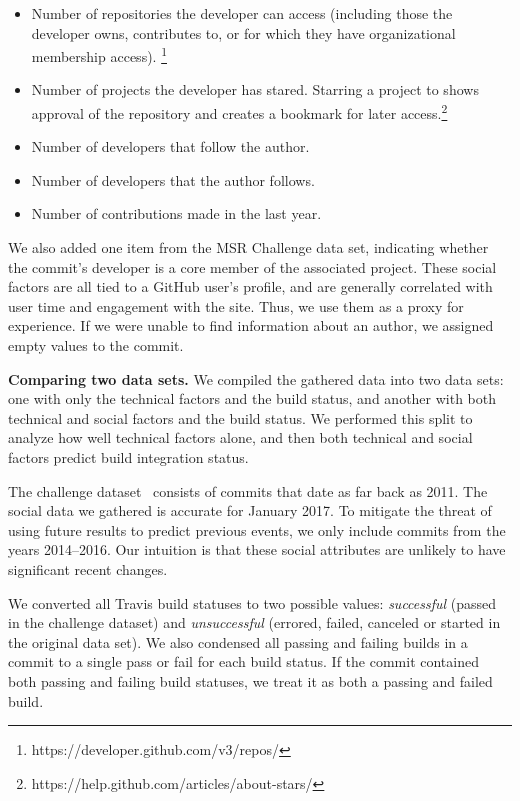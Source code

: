 \documentclass[10pt, conference]{IEEEtran}
\begin{document}
\begin{itemize}
	\item Number of repositories the developer can access (including those
the developer owns, contributes to, or for which they have
organizational membership access).%
\footnote{https://developer.github.com/v3/repos/}
\item  Number of projects the developer has stared. Starring a project
to shows approval of the repository and creates a bookmark for later 
access.\footnote{https://help.github.com/articles/about-stars/}
\item Number of developers that follow the author. 
\item Number of developers that the author follows.
\item Number of contributions made in the last year.
\end{itemize}

We also added one item from the MSR Challenge data set, indicating
whether the commit's developer is a core member  
of the associated project.
These social factors are all tied to a GitHub user's profile,
and are generally correlated with user time and engagement with the site.
Thus, we use them as a proxy for
experience.  If we were unable to find information about an author, we
assigned empty values to the commit.

\vspace{1ex}
\noindent\textbf{Comparing two data sets.} We compiled the gathered data into 
two data sets: one with only the technical
factors and the build status, and another with both technical and social
factors and the build status. We performed this split to analyze how well technical factors alone,
and then both technical and social
factors predict build integration status.

The challenge dataset~\cite{msr17challenge} consists
of commits that date as far back as 2011. The social data we 
gathered is accurate for January 2017. To mitigate the threat of
using future results to predict previous events,
we only include commits from the years 2014--2016.  Our intuition is
that these social attributes are unlikely to have significant recent changes.

We converted all Travis build statuses to two possible values:
\emph{successful} (passed in the challenge dataset) and \emph{unsuccessful}
(errored, failed, canceled
or started in the original data set). We also condensed all passing and
failing builds in a commit to a single pass or fail for each build status.  If
the commit contained both passing and failing build statuses, we treat it as
both a passing and failed build. 
\end{document}
